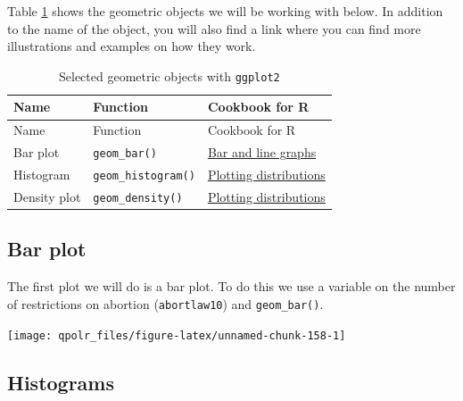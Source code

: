 \documentclass[12pt,oneside]{reedthesis}
\theoremstyle{definition}
\theoremstyle{definition}
\theoremstyle{definition}
\theoremstyle{remark}
\begin{document}
  Table \ref{tab:distributions} shows the geometric objects we will be
  working with below. In addition to the name of the object, you will also
  find a link where you can find more illustrations and examples on how
  they work.
  \begin{longtable}[]{@{}lll@{}}
  \caption{\label{tab:distributions} Selected geometric objects with
  \texttt{ggplot2}}\tabularnewline
  \toprule
  Name & Function & Cookbook for R\tabularnewline
  \midrule
  \endfirsthead
  \toprule
  Name & Function & Cookbook for R\tabularnewline
  \midrule
  \endhead
  Bar plot & \texttt{geom\_bar()} &
  \href{http://www.cookbook-r.com/Graphs/Bar_and_line_graphs_(ggplot2)/}{Bar
  and line graphs}\tabularnewline
  Histogram & \texttt{geom\_histogram()} &
  \href{http://www.cookbook-r.com/Graphs/Plotting_distributions_(ggplot2)/}{Plotting
  distributions}\tabularnewline
  Density plot & \texttt{geom\_density()} &
  \href{http://www.cookbook-r.com/Graphs/Plotting_distributions_(ggplot2)/}{Plotting
  distributions}\tabularnewline
  \bottomrule
  \end{longtable}
  \subsection{Bar plot}\label{bar-plot}
  
  The first plot we will do is a bar plot. To do this we use a variable on
  the number of restrictions on abortion (\texttt{abortlaw10}) and
  \texttt{geom\_bar()}.
  \begin{Shaded}
  \begin{Highlighting}[]
  \NormalTok{(}\OperatorTok{+}
  \StringTok{  }\NormalTok{() }
  \end{Highlighting}
  \end{Shaded}
  \begin{center}\texttt{[image: qpolr\_files/figure-latex/unnamed-chunk-158-1]} \end{center}
  
  \subsection{Histograms}\label{histograms}
  
\end{document}
